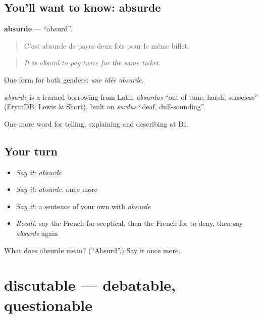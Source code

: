 \subsection*{You'll want to know: absurde}
\textbf{absurde} — \textquotedblleft{}absurd\textquotedblright{}.

\begin{quote}
C'est absurde de payer deux fois pour le même billet.
\end{quote}

\begin{quote}
\emph{It is absurd to pay twice for the same ticket.}
\end{quote}

One form for both genders: \emph{une idée absurde}.

\begin{cousinweb}
\emph{absurde} is a learned borrowing from Latin \emph{absurdus} \textquotedblleft{}out of tune, harsh; senseless\textquotedblright{} (EtymDB; Lewis \& Short), built on \emph{surdus} \textquotedblleft{}deaf, dull-sounding\textquotedblright{}.
\end{cousinweb}

\begin{grammarlens}[title={What you've built}]
One more word for telling, explaining and describing at B1.
\end{grammarlens}

\subsection*{Your turn}
\begin{itemize}
\raggedright
  \item \emph{Say it:} \emph{absurde}
  \item \emph{Say it:} \emph{absurde}, once more
  \item \emph{Say it:} a sentence of your own with \emph{absurde}
  \item \emph{Recall:} say the French for sceptical, then the French for to deny, then say \emph{absurde} again
\end{itemize}

\begin{tcolorbox}[breakable,colback=teal!4,colframe=teal!35!black,title={Before you move on}]
What does absurde mean? (\textquotedblleft{}Absurd\textquotedblright{}.) Say it once more.
\end{tcolorbox}
\section[discutable]{discutable — debatable, questionable}

